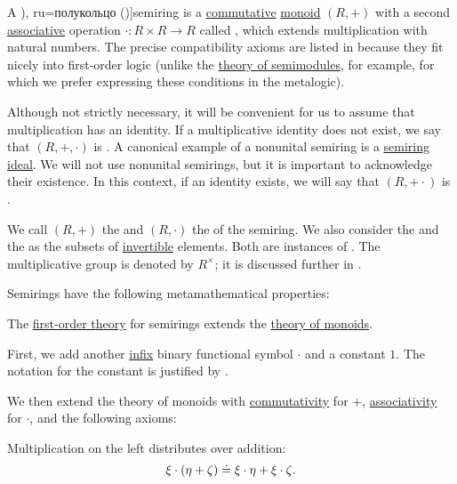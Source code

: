 \begin{definition}\label{def:semiring}
  A \term[ru=полупръстен (\cite[372]{ГеновМиховскиМоллов1991}), ru=полукольцо (\cite[4]{ВечтомовПетров2022})]{semiring} is a \hyperref[def:binary_operation/commutative]{commutative} \hyperref[def:monoid]{monoid} \( (R, +) \) with a second \hyperref[def:binary_operation/associative]{associative} operation \( \cdot: R \times R \to R \) called , which extends multiplication with natural numbers. The precise compatibility axioms are listed in  because they fit nicely into first-order logic (unlike the \hyperref[def:semimodule/theory]{theory of semimodules}, for example, for which we prefer expressing these conditions in the metalogic).

  Although not strictly necessary, it will be convenient for us to assume that multiplication has an identity. If a multiplicative identity does not exist, we say that \( (R, +, \cdot) \) is . A canonical example of a nonunital semiring is a \hyperref[def:semiring_ideal]{semiring ideal}. We will not use nonunital semirings, but it is important to acknowledge their existence. In this context, if an identity exists, we will say that \( (R, + \cdot) \) is .

  We call \( (R, +) \) the  and \( (R, \cdot) \) the  of the semiring. We also consider the  and the  as the subsets of \hyperref[def:monoid_inverse]{invertible} elements. Both are instances of . The multiplicative group is denoted by \( R^\times \); it is discussed further in .

  Semirings have the following metamathematical properties:
  \begin{thmenum}
     The \hyperref[def:first_order_theory]{first-order theory} for semirings extends the \hyperref[def:monoid/theory]{theory of monoids}.

    First, we add another \hyperref[rem:first_order_formula_conventions/infix]{infix} binary functional symbol \( \cdot \) and a constant \( 1 \). The notation for the constant is justified by .

    We then extend the theory of monoids with \hyperref[def:binary_operation/commutative]{commutativity} for \( + \), \hyperref[def:binary_operation/associative]{associativity} for \( \cdot \), and the following axioms:
    \begin{thmenum}
       Multiplication on the left distributes over addition:
      \begin{equation}\label{eq:def:semiring/left_distributivity}
        \xi \cdot (\eta + \zeta) \doteq \xi \cdot \eta + \xi \cdot \zeta.
      \end{equation}


\end{thmenum}
\end{thmenum}
\end{definition}
